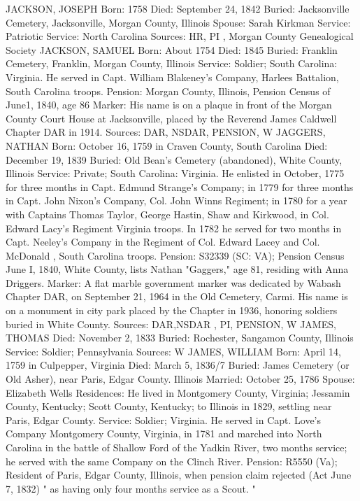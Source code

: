 JACKSON, JOSEPH 
Born: 1758 
Died: September 24, 1842 
Buried: Jacksonville Cemetery, Jacksonville, Morgan County, Illinois 
Spouse: Sarah Kirkman 
Service: Patriotic
Service: North Carolina 
Sources: HR, PI , Morgan County Genealogical Society 
JACKSON, SAMUEL 
Born: About 1754 
Died: 1845 
Buried: Franklin Cemetery, Franklin, Morgan County, Illinois 
Service: Soldier; South Carolina: Virginia. He served in Capt. William Blakeney's Company, Harlees Battalion, South Carolina troops. 
Pension: Morgan County, Illinois, Pension Census of June1, 1840, age 86 
Marker: His name is on a plaque in front of the Morgan County Court House at Jacksonville, placed by the Reverend James Caldwell Chapter DAR in 1914. 
Sources: DAR, NSDAR, PENSION, W 
JAGGERS, NATHAN 
Born: October 16, 1759 in Craven County, South Carolina
Died: December 19, 1839 
Buried: Old Bean's Cemetery (abandoned), White County, Illinois 
Service: Private; South Carolina: Virginia. He enlisted in October, 1775 for three months in Capt. Edmund Strange's Company; in 1779 for three months in Capt. John Nixon's Company, Col. John Winns Regiment; in 1780 for a year with Captains Thomas Taylor, George Hastin, Shaw and Kirkwood, in Col. Edward Lacy's Regiment Virginia troops. In 1782 he served for two months in Capt. Neeley's Company in the Regiment of Col. Edward Lacey and Col. McDonald , South Carolina troops. 
Pension: S32339 (SC: VA); Pension Census June I, 1840, White County, lists Nathan "Gaggers," age 81, residing with Anna Driggers. 
Marker: A flat marble government marker was dedicated by Wabash Chapter DAR, on September 21, 1964 in the Old Cemetery, Carmi. His name is on a monument in city park placed by the Chapter in 1936, honoring soldiers buried in White County. 
Sources: DAR,NSDAR , PI, PENSION, W 
JAMES, THOMAS 
Died: November 2, 1833 
Buried: Rochester, Sangamon County, Illinois
Service: Soldier; Pennsylvania 
Sources: W 
JAMES, WILLIAM 
Born: April 14, 1759 in Culpepper, Virginia 
Died: March 5, 1836/7 
Buried: James Cemetery (or Old Asher), near Paris, Edgar County. Illinois 
Married: October 25, 1786 
Spouse: Elizabeth Wells 
Residences: He lived in Montgomery County, Virginia; Jessamin County, Ken­tucky; Scott County, Kentucky; to Illinois in 1829, settling near Paris, Edgar County. 
Service: Soldier; Virginia. He served in Capt. Love's Company Montgomery County, Virginia, in 1781 and marched into North Carolina in the battle of Shallow Ford of the Yadkin River, two months service; he served with the same Company on the Clinch River. 
Pension: R5550 (Va); Resident of Paris, Edgar County, Illinois, when pension claim rejected (Act June 7, 1832) " as having only four months service as a Scout. " 

